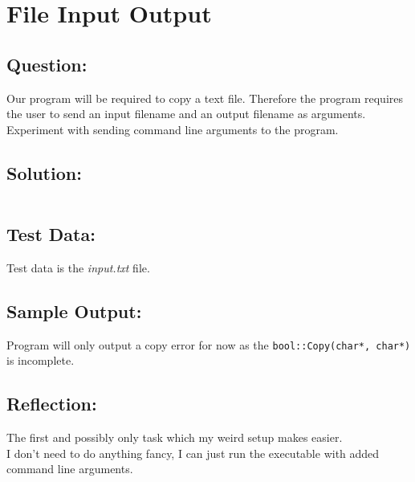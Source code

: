 \documentclass[Lab-C.tex]{subfiles}
\begin{document}
    \section{File Input Output}
        \subsection*{Question:}
            Our program will be required to copy a text file. Therefore the program requires the user to send an input filename and an output filename as arguments.
            Experiment with sending command line arguments to the program.
            
        \subsection*{Solution:}
            \inputminted{cpp}{../01-FileIO/FileIO.cpp}%

        \subsection*{Test Data:}
            Test data is the \textit{input.txt} file.
        
        \subsection*{Sample Output:}
            Program will only output a copy error for now as the \texttt{bool::Copy(char*, char*)}
            is incomplete.

        \subsection*{Reflection:}
            The first and possibly only task which my weird setup makes easier. \\ 
            I don't need to do anything fancy, I can just run the executable
            with added command line arguments.
\end{document}
